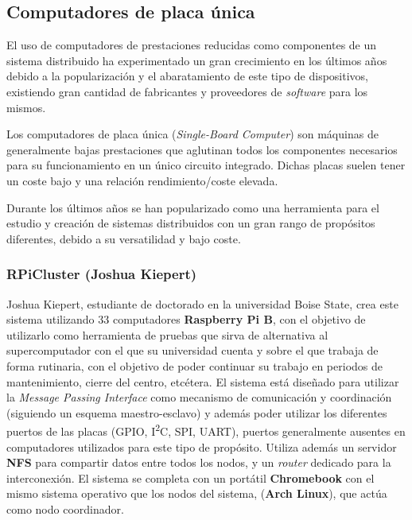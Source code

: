 
\subsection{Computadores de placa única}

El uso de computadores de prestaciones reducidas como componentes de un sistema distribuido ha experimentado un gran crecimiento en los últimos años debido a la popularización y el abaratamiento de este tipo de dispositivos, existiendo gran cantidad de fabricantes y proveedores de \textit{software} para los mismos.

Los computadores de placa única (\textit{Single-Board Computer}) son máquinas de generalmente bajas prestaciones que aglutinan todos los componentes necesarios para su funcionamiento en un único circuito integrado. Dichas placas suelen tener un coste bajo y una relación rendimiento/coste elevada.

Durante los últimos años se han popularizado como una herramienta para el estudio y creación de sistemas distribuidos con un gran rango de propósitos diferentes, debido a su versatilidad y bajo coste.

\subsubsection{RPiCluster (Joshua Kiepert)}

Joshua Kiepert, estudiante de doctorado en la universidad Boise State, crea este sistema utilizando 33 computadores \textbf{Raspberry Pi B}, con el objetivo de utilizarlo como herramienta de pruebas que sirva de alternativa al supercomputador con el que su universidad cuenta\cite{joshuarpicluster} y sobre el que trabaja de forma rutinaria, con el objetivo de poder continuar su trabajo en periodos de mantenimiento, cierre del centro, etcétera. El sistema está diseñado para utilizar la \textit{Message Passing Interface} como mecanismo de comunicación y coordinación (siguiendo un esquema maestro-esclavo) y además poder utilizar los diferentes puertos de las placas (GPIO, I\textsuperscript{2}C, SPI, UART), puertos generalmente ausentes en computadores utilizados para este tipo de propósito. Utiliza además un servidor \textbf{NFS} para compartir datos entre todos los nodos, y un \textit{router} dedicado para la interconexión. El sistema se completa con un portátil \textbf{Chromebook} con el mismo sistema operativo que los nodos del sistema, (\textbf{Arch Linux}), que actúa como nodo coordinador.

